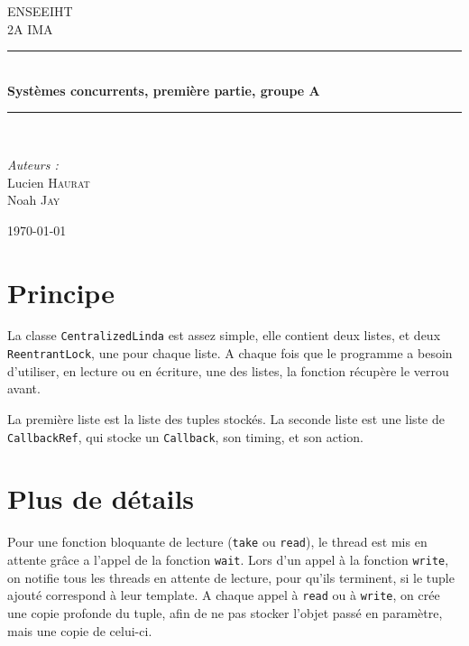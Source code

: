 \documentclass[a4paper,12pt]{article}
\begin{document}
\begin{titlepage}
\begin{center}

{\large ENSEEIHT}\\[0.5cm]

{\large 2A IMA}\\[0.5cm]

\rule{\linewidth}{0.5mm} \\[0.4cm]
{ \huge \bfseries Systèmes concurrents, première partie, groupe A \\[0.4cm] }
\rule{\linewidth}{0.5mm} \\[1.5cm]

\noindent
\begin{minipage}{0.4\textwidth}
  \begin{flushleft} \large
    \emph{Auteurs :}\\
    Lucien \textsc{Haurat}\\
    Noah \textsc{Jay}
  \end{flushleft}
\end{minipage}%

\vfill

{\large \today}

\end{center}
\end{titlepage}


\clearpage
\tableofcontents
\newpage

\section{Principe}
La classe \texttt{CentralizedLinda} est assez simple, elle contient deux listes, et deux \texttt{ReentrantLock}, une pour chaque liste. A chaque fois que le programme a besoin d'utiliser, en lecture ou en écriture, une des listes, la fonction récupère le verrou avant.

La première liste est la liste des tuples stockés.
La seconde liste est une liste de \texttt{CallbackRef}, qui stocke un \texttt{Callback}, son timing, et son action.

\section{Plus de détails}
Pour une fonction bloquante de lecture (\texttt{take} ou \texttt{read}), le thread est mis en attente grâce a l'appel de la fonction \texttt{wait}. Lors d'un appel à la fonction \texttt{write}, on notifie tous les threads en attente de lecture, pour qu'ils terminent, si le tuple ajouté correspond à leur template.
A chaque appel à \texttt{read} ou à \texttt{write}, on crée une copie profonde du tuple, afin de ne pas stocker l'objet passé en paramètre, mais une copie de celui-ci.
\end{document}
